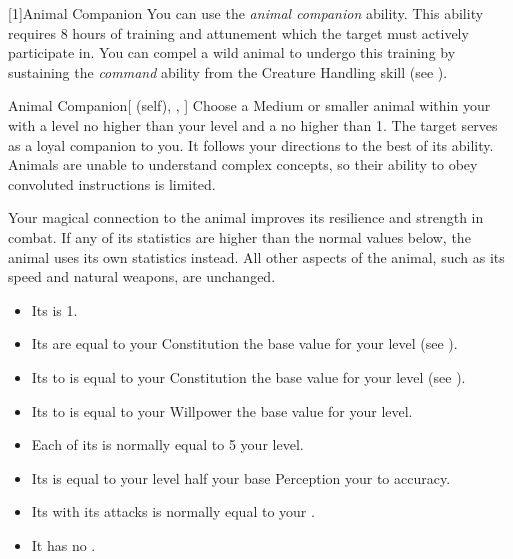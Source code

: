         [1]{Animal Companion}
        You can use the \textit{animal companion} ability.
        This ability requires 8 hours of training and attunement which the target must actively participate in.
        You can compel a wild animal to undergo this training by sustaining the \textit{command} ability from the Creature Handling skill (see ).
        \begin{attuneability}{Animal Companion}[ (self), , ]
            Choose a Medium or smaller animal  within your  with a level no higher than your level and a  no higher than 1.
            The target serves as a loyal companion to you.
            It follows your directions to the best of its ability.
            Animals are unable to understand complex concepts, so their ability to obey convoluted instructions is limited.

            Your magical connection to the animal improves its resilience and strength in combat.
            If any of its statistics are higher than the normal values below, the animal uses its own statistics instead.
            All other aspects of the animal, such as its speed and natural weapons, are unchanged.
            \begin{itemize}
                \item Its  is 1.
                \item Its  are equal to your Constitution \add the base value for your level (see ).
                \item Its  to  is equal to your Constitution \add the base value for your level (see ).
                \item Its  to  is equal to your Willpower \add the base value for your level.
                \item Each of its  is normally equal to 5 \add your level.
                \item Its  is equal to your level \add half your base Perception \add your  to accuracy.
                \item Its  with its attacks is normally equal to your  .
                \item It has no .
            \end{itemize}
        \end{attuneability}

